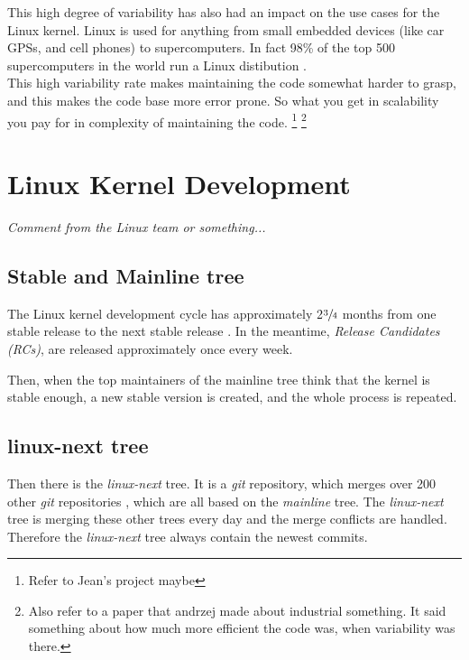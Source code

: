 \documentclass[a4paper,11pt]{report}
\begin{document}
This high degree of variability has also had an impact on the use cases for the 
Linux kernel. Linux is used for anything from small embedded devices (like car 
GPSs, and cell phones) to supercomputers.
In fact 98\% of the top 500 supercomputers in the world run a Linux distibution
    \cite{top500}
.
\\

This high variability rate makes maintaining the code somewhat harder to 
grasp, and this makes the code base more error prone. So what you get in 
scalability you pay for in complexity of maintaining the code. 
    \footnote{Refer to Jean's project maybe}
    \footnote{Also refer to a paper that andrzej made about industrial 
        something. It said something about how much more efficient the code was,
        when variability was there.}


        \section{Linux Kernel Development}

\begin{center}
    \emph{
        Comment from the Linux team or something...
    }
\end{center}


        \subsection*{Stable and Mainline tree}

The Linux kernel development cycle has approximately 2$\sfrac{3}{4}$ months 
from one stable release to the next stable release
    \cite{crystalball}
.
In the meantime, \emph{Release Candidates (RCs)}, are released approximately 
once every week.

Then, when the top maintainers of the mainline tree think that the kernel is 
stable enough, a new stable version is created, and the whole process is 
repeated.


        \subsection*{linux-next tree}

Then there is the \emph{linux-next} tree. It is a \emph{git} repository, which 
merges over 200 other \emph{git} repositories
    \cite{nextTrees}
, which 
are all based on the \emph{mainline} tree. The \emph{linux-next} tree is 
merging these other trees every day and the merge conflicts are handled. 
Therefore the \emph{linux-next} tree always contain the newest commits. 
\end{document}

